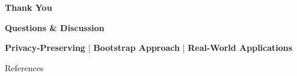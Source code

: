 \documentclass[aspectratio=169,xcolor={dvipsnames}]{beamer}
\begin{document}
\begin{frame}[plain]
  \centering
  \Huge \textbf{Thank You}
  
  \vspace{0.5em}
  \Large \textbf{Questions \& Discussion}
  
  \vspace{2em}
  \begin{block}{}
    \centering
    \textbf{Privacy-Preserving} | \textbf{Bootstrap Approach} | \textbf{Real-World Applications}
  \end{block}
\end{frame}

\begin{frame}[allowframebreaks]{References}
  \begin{block}{}
    \footnotesize
    \printbibliography[heading=none]
  \end{block}
\end{frame}
\end{document}
